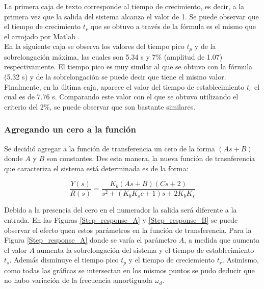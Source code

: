 \documentclass[journal]{IEEEtran}
\begin{document}
La primera caja de texto corresponde al tiempo de 
crecimiento, es decir, a la primera vez que la salida 
del sistema alcanza el valor de 1.
Se puede observar que el tiempo de
crecimiento $t_r$ que se obtuvo a trav\'es de la f\'ormula
es el mismo que el arrojado por 
Matlab . \\

En la siguiente caja se 
observa los valores del tiempo pico $t_p$ y de la 
sobrelongaci\'on m\'axima, las cuales son 5.34 s y 
7\% (amplitud de 1.07) respectivamente. El tiempo pico es 
muy similar al que se obtuvo con la f\'ormula (5.32 s) y 
de la sobrelongaci\'on se puede decir que tiene el mismo 
valor. \\

Finalmente, en la \'ultima caja, aparece el 
valor del tiempo de establecimiento $t_s$ el cual es de
7.76 s. Comparando este valor con el que se obtuvo utilizando
el criterio del 2\%, se puede observar que son bastante 
similares.
%

\subsubsection*{Agregando un cero a la funci\'on}
Se decidi\'o agregar a la funci\'on de transferencia un 
cero de la forma $(As + B)$ donde $A$ y $B$ son constantes. 
Des esta manera, la nueva funci\'on  de trasnferencia que 
caracteriza el sistema est\'a determinada es de la forma: 

\begin{equation}
\boxed{
	\frac{Y(s)}{R(s)} = \frac{K_b(A s + B)(C s + 2)}
	{s^2 + (K_b K_s c + 1 )s + 2 K_b K_s } 
}
\end{equation}

Debido a la presencia del cero en el numerador la salida 
ser\'a diferente a la entrada. En las Figuras
\ref{Step_response_A} y \ref{Step_response_B} se puede 
observar el efecto quen estos par\'ametros en la funci\'on 
de transferencia. Para la Figura \ref{Step_response_A} 
donde se varía el par\'ametro $A$, a medida que aumenta el 
valor $A$ aumenta la sobrelongaci\'on del sistema y el tiempo
de establecimiento $t_s$. Adem\'as
disminuye el tiempo pico $t_p$ y el tiempo de creciemiento 
$t_r$. Asimismo, como todas las gr\'aficas se intersectan en
los mismos puntos se pudo deducir que no hubo variaci\'on de
la frecuencia amortiguada $\omega_d$. \\
\end{document}
